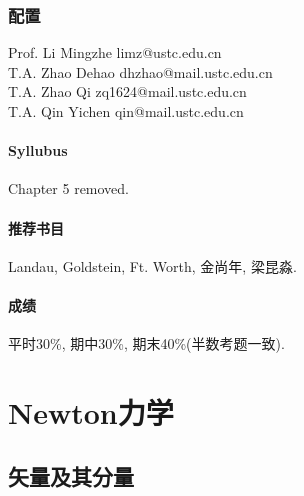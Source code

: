 \documentclass{ctexart}
\begin{document}
\subsubsection*{配置} %
\label{ssub:配置}

\noindent
Prof. Li Mingzhe limz@ustc.edu.cn\\
T.A. Zhao Dehao dhzhao@mail.ustc.edu.cn\\
T.A. Zhao Qi zq1624@mail.ustc.edu.cn\\
T.A. Qin Yichen qin@mail.ustc.edu.cn

\paragraph{Syllubus} %
\label{par:syllubus}

Chapter 5 removed.


\paragraph{推荐书目} %
\label{par:推荐书目}

Landau, Goldstein, Ft. Worth, 金尚年, 梁昆淼.


\paragraph{成绩} %
\label{par:成绩}

平时30\%, 期中30\%, 期末40\%(半数考题一致).



\section{Newton力学} %
\label{sec:newton力学}

\subsection{矢量及其分量} %
\label{sub:矢量及其分量}
\end{document}
